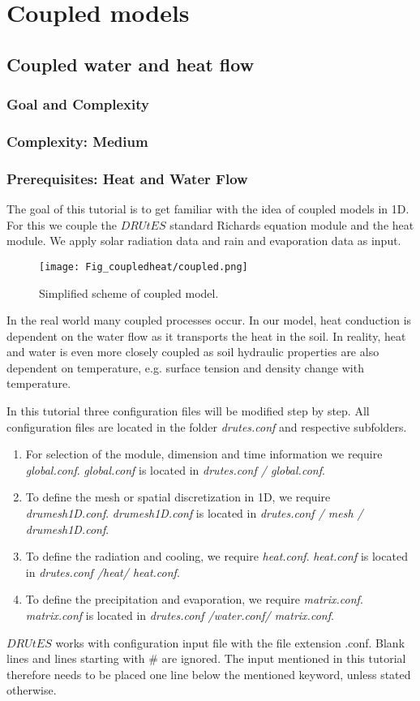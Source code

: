 \chapter{Coupled models}
\section{Coupled water and heat flow}
\subsection{Goal and Complexity}
\subsection*{Complexity: Medium}

\subsection*{Prerequisites: Heat and Water Flow} 

The goal of this tutorial is to get familiar with the idea of coupled models in 1D. For this we couple the $DRUtES$ standard Richards equation module and the heat module. We apply solar radiation data and rain and evaporation data as input.

\begin{figure}[!h]
\centering
\texttt{[image: Fig\_coupledheat/coupled.png]}
\caption{Simplified scheme of coupled model.}
\end{figure}

In the real world many coupled processes occur. In our model, heat conduction is dependent on the water flow as it transports the heat in the soil. 
In reality, heat and water is even more closely coupled as soil hydraulic properties are also dependent on temperature, e.g. surface tension and density change with temperature.  

In this tutorial three configuration files will be modified step by step. All configuration files are located in the folder \emph{drutes.conf} and respective subfolders. \begin{enumerate}
\item For selection of the module, dimension and time information we require \emph{global.conf}.  \emph{global.conf} is located in \emph{drutes.conf / global.conf}. 
\item To define the mesh or spatial discretization in 1D,  we require \emph{drumesh1D.conf}. \emph{drumesh1D.conf} is located in \emph{drutes.conf / mesh / drumesh1D.conf}. 
\item To define the radiation and cooling, we require \emph{heat.conf}. \emph{heat.conf} is located in \emph{drutes.conf /heat/ heat.conf}. 
\item To define the precipitation and evaporation, we require \emph{matrix.conf}. \emph{matrix.conf} is located in \emph{drutes.conf /water.conf/ matrix.conf}. 
\end{enumerate}
$DRUtES$ works with configuration input file with the file extension .conf. Blank lines and lines starting with \# are ignored. The input mentioned in this tutorial therefore needs to be placed one line below the mentioned keyword, unless stated otherwise. 

